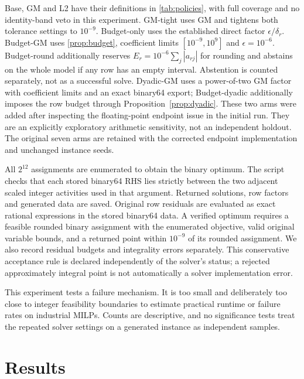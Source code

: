 \documentclass[11pt]{article}
\theoremstyle{definition}
\theoremstyle{remark}
\begin{document}
Base, GM and L2 have their definitions in \cref{tab:policies}, with full coverage and no
identity-band veto in this experiment. GM-tight uses GM and tightens both tolerance
settings to $10^{-9}$. Budget-only uses the established direct factor
$\epsilon/\delta_r$. Budget-GM uses \cref{prop:budget}, coefficient limits
$[10^{-9},10^9]$ and $\epsilon=10^{-6}$. Budget-round additionally reserves
$E_r=10^{-6}\sum_j|a_{rj}|$ for rounding and abstains on the whole model if any row has
an empty interval. Abstention is counted separately, not as a successful solve.
Dyadic-GM uses a power-of-two GM factor with coefficient limits and an exact
binary64 export; Budget-dyadic additionally imposes the row budget through
Proposition~\ref{prop:dyadic}. These two arms were added after inspecting the
floating-point endpoint issue in the initial run. They are an explicitly exploratory
arithmetic sensitivity, not an independent holdout. The original seven arms are retained
with the corrected endpoint implementation and unchanged instance seeds.

All $2^{12}$ assignments are enumerated to obtain the binary optimum. The script checks
that each stored binary64 RHS lies strictly between the two adjacent scaled integer
activities used in that argument. Returned solutions, row factors and generated data
are saved. Original row residuals are evaluated as exact rational expressions in the
stored binary64 data. A verified optimum requires a feasible rounded binary assignment
with the enumerated objective, valid original variable bounds, and a returned point
within $10^{-9}$ of its rounded assignment. We also record residual budgets and
integrality errors separately. This conservative acceptance rule is declared independently
of the solver's status; a rejected approximately integral point is not automatically a
solver implementation error.

This experiment tests a failure mechanism. It is too small and deliberately too close
to integer feasibility boundaries to estimate practical runtime or failure rates on
industrial MILPs. Counts are descriptive, and no significance tests treat the repeated
solver settings on a generated instance as independent samples.

\section{Results}
\label{sec:results}
\end{document}
